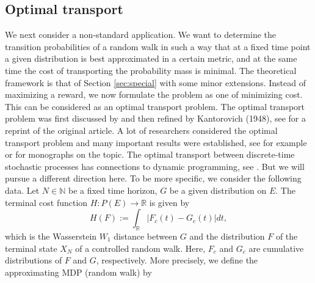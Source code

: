 \documentclass[reqno, 12pt]{amsart}%
\newcommand{\R}{\mathbb{R}} %
\newcommand{\N}{\mathbb{N}} %
\newcommand{\EE}{\mathbb{E}}
\theoremstyle{definition}
\numberwithin{equation}{section} \numberwithin{theorem}{section}
\begin{document}
 \subsection{Optimal transport}
We next consider a non-standard  application. We want to determine the transition probabilities of a  random walk in such a way that at a fixed time point a 
given distribution is best approximated in 
a certain metric, and at the same time the cost of transporting the probability mass is minimal.  The theoretical framework is that of Section \ref{sec:special} with some minor extensions. Instead of maximizing a reward,  we now formulate the problem as one of minimizing cost. This can be considered as an optimal transport problem. The optimal transport problem was  first discussed by \cite{monge1781memoire} and then refined by Kantorovich (1948), see \cite{kantorovich2006problem} for a reprint of the original article. A lot of researchers considered the optimal transport problem and many important results were established, see for example \cite{rachev2006mass2,rachev2006mass} or \cite{villani2008optimal} for  monographs on the topic. The optimal transport between discrete-time stochastic processes has connections to dynamic programming, see \cite{terpin2024dynamic,backhoff2017causal,moulos2021bicausal}. But we will pursue a different direction here. To be more specific, we 
consider the following data. Let $N\in\N$ be a fixed time horizon, $G$ be a given 
distribution on $E$. 
The terminal cost function  $H:P(E) \to \R$ is given by 
$$ H(F) := \int_{\R} |F_c(t)-G_c(t)|dt,$$
which is the Wasserstein $W_1$ distance between $G$ 
and the distribution $F$ of the terminal state 
$X_N$ of a controlled random walk. Here, $F_c$ and 
$G_c$ are cumulative distributions of $F$ and 
$G$, respectively.
More precisely, we define the approximating MDP (random walk) by
\end{document}
